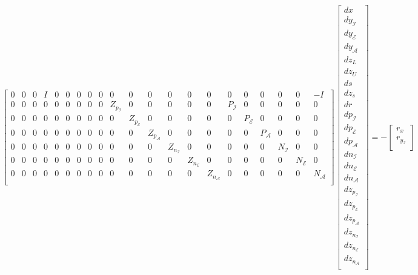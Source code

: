 \documentclass[10pt]{article}
\begin{document}
\begin{equation}
\begin{aligned}
\begin{bmatrix}
			0 & 0 & 0 & I & 0 & 0 & 0 & 0 & 0 & 0 & 0 & 0 & 0 & 0 & 0 & 0 & 0 & 0 & 0 & 0 & -I\\
			0 & 0 & 0 & 0 & 0 & 0 & 0 & 0 & 0 & Z_{p_{\mathcal I}} & 0 & 0 & 0 & 0 & 0 & P_{\mathcal I} & 0 & 0 & 0 & 0 & 0\\
			0 & 0 & 0 & 0 & 0 & 0 & 0 & 0 & 0 & 0 & Z_{p_{\mathcal E}} & 0 & 0 & 0 & 0 & 0 & P_{\mathcal E} & 0 & 0 & 0 & 0\\
			0 & 0 & 0 & 0 & 0 & 0 & 0 & 0 & 0 & 0 & 0 & Z_{p_{\mathcal A}} & 0 & 0 & 0 & 0 & 0 & P_{\mathcal A} & 0 & 0 & 0\\
			0 & 0 & 0 & 0 & 0 & 0 & 0 & 0 & 0 & 0 & 0 & 0 & Z_{n_{\mathcal I}} & 0 & 0 & 0 & 0 & 0 & N_{\mathcal I} & 0 & 0\\
			0 & 0 & 0 & 0 & 0 & 0 & 0 & 0 & 0 & 0 & 0 & 0 & 0 & Z_{n_{\mathcal E}} & 0 & 0 & 0 & 0 & 0 & N_{\mathcal E} & 0\\
			0 & 0 & 0 & 0 & 0 & 0 & 0 & 0 & 0 & 0 & 0 & 0 & 0 & 0 & Z_{n_{\mathcal A}} & 0 & 0 & 0 & 0 & 0 & N_{\mathcal A}\\
		\end{bmatrix}
		\begin{bmatrix}
		dx \\
		dy_{\mathcal I} \\
		dy_{\mathcal E} \\
		dy_{\mathcal A} \\
		dz_L \\
		dz_U \\
		ds \\
		dz_s \\
		dr \\
		dp_{\mathcal I} \\
		dp_{\mathcal E} \\
		dp_{\mathcal A} \\
		dn_{\mathcal I} \\
		dn_{\mathcal E} \\
		dn_{\mathcal A} \\
		dz_{p_{\mathcal I}} \\
		dz_{p_{\mathcal E}} \\
		dz_{p_{\mathcal A}} \\
		dz_{n_{\mathcal I}} \\
		dz_{n_{\mathcal E}} \\
		dz_{n_{\mathcal A}} \\
		\end{bmatrix}
		=
		-\begin{bmatrix}
		r_x \\
		r_{y_{\mathcal I}} \\

\end{bmatrix}
\end{aligned}
\end{equation}
\end{document}
